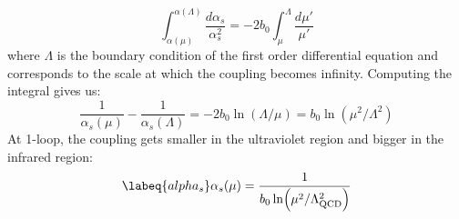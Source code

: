 \documentclass[../main.tex]{subfiles}
\begin{document}
\[
\int_{\alpha(\mu)}^{\alpha(\Lambda)}\frac{d\alpha_s}{\alpha_s^2}=-2b_0\int_\mu^\Lambda\frac{d\mu'}{\mu'}
\]
where $\Lambda$ is the boundary condition of the first order differential equation and corresponds to the scale at which the coupling becomes infinity. Computing the integral gives us:
\[
\frac{1}{\alpha_s(\mu)}-\frac{1}{\alpha_s(\Lambda)}=-2b_0\ln{(\Lambda/\mu)}=b_0\ln{(\mu^2/\Lambda^2)}
\]
At 1-loop, the coupling gets smaller in the ultraviolet region and bigger in the infrared region:
\begin{equation}
\labeq{alpha_s}
\alpha_s(\mu)=\frac{1}{b_0\ln(\mu^2/\Lambda_{\text{QCD}}^2)}
\end{equation}
\end{document}
